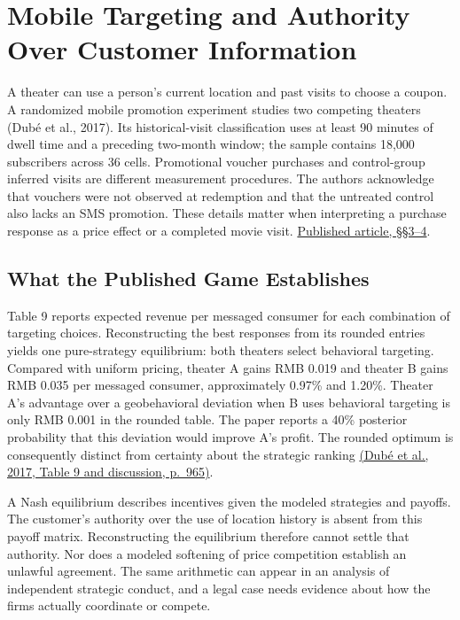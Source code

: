 
\hypertarget{M09-mobile-targeting-and-authority-over-customer-information}{%
\section{Mobile Targeting and Authority Over Customer
Information}\label{M09-mobile-targeting-and-authority-over-customer-information}}

\noindent \noindent A theater can use a person's current location and past visits
to choose a coupon. A randomized mobile promotion experiment studies two
competing theaters (Dubé et al., 2017). Its historical-visit
classification uses at least 90 minutes of dwell time and a preceding
two-month window; the sample contains 18,000 subscribers across 36
cells. Promotional voucher purchases and control-group inferred visits
are different measurement procedures. The authors acknowledge that
vouchers were not observed at redemption and that the untreated control
also lacks an SMS promotion. These details matter when interpreting a
purchase response as a price effect or a completed movie visit.
\href{https://www.fox.temple.edu/sites/fox/files/competitive-price-targeting-pub.pdf}{Published
article, §§3--4}.

\hypertarget{M09-what-the-published-game-establishes}{%
\subsection{What the Published Game
Establishes}\label{M09-what-the-published-game-establishes}}

\noindent \noindent Table 9 reports expected revenue per messaged consumer for
each combination of targeting choices. Reconstructing the best responses
from its rounded entries yields one pure-strategy equilibrium: both
theaters select behavioral targeting. Compared with uniform pricing,
theater A gains RMB 0.019 and theater B gains RMB 0.035 per messaged
consumer, approximately 0.97\% and 1.20\%. Theater A's advantage over a
geobehavioral deviation when B uses behavioral targeting is only RMB
0.001 in the rounded table. The paper reports a 40\% posterior
probability that this deviation would improve A's profit. The rounded
optimum is consequently distinct from certainty about the strategic
ranking \href{https://doi.org/10.1287/mksc.2017.1042}{(Dubé et al.,
2017, Table 9 and discussion, p.~965)}.

A Nash equilibrium describes incentives given the modeled strategies and
payoffs. The customer's authority over the use of location history is
absent from this payoff matrix. Reconstructing the equilibrium therefore
cannot settle that authority. Nor does a modeled softening of price
competition establish an unlawful agreement. The same arithmetic can
appear in an analysis of independent strategic conduct, and a legal case
needs evidence about how the firms actually coordinate or compete.

